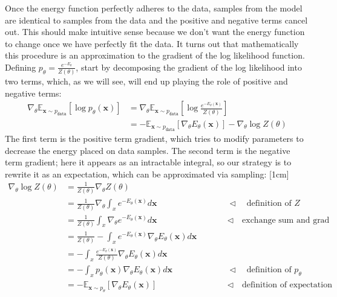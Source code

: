 Once the energy function perfectly adheres to the data, samples from the model are identical to samples from the data and the positive and negative terms cancel out. This should make intuitive sense because we don't want the energy function to change once we have perfectly fit the data. It turns out that mathematically this procedure is an approximation to the gradient of the log likelihood function. Defining $p_{\theta} = \frac{e^{-E_{\theta}}}{Z(\theta)}$, start by decomposing the gradient of the log likelihood into two terms, which, as we will see, will end up playing the role of positive and negative terms:
\begin{align}
    \nabla_{\theta} \mathbb{E}_{\mathbf{x} \sim p_{\texttt{data}}}[\log p_{\theta}(\mathbf{x})] &= \nabla_{\theta} \mathbb{E}_{\mathbf{x} \sim p_{\texttt{data}}}[\log \frac{e^{-E_{\theta}(\mathbf{x})}}{Z(\theta)}]\\
    &= -\mathbb{E}_{\mathbf{x} \sim p_{\texttt{data}}}[\nabla_{\theta} E_{\theta}(\mathbf{x})] - \nabla_{\theta} \log Z(\theta)\label{eqn:generative_models:cd}
\end{align}
The first term is the positive term gradient, which tries to modify parameters to decrease the energy placed on data samples. The second term is the negative term gradient; here it appears as an intractable integral, so our strategy is to rewrite it as an expectation, which can be approximated via sampling:
[1cm]
\begin{align}
    \nabla_{\theta} \log Z(\theta) &= \frac{1}{Z(\theta)}\nabla_{\theta}Z(\theta) \label{eqn:generative_models:grad_log_identity} \\
    &= \frac{1}{Z(\theta)} \nabla_{\theta} \int_x e^{-E_{\theta}(\mathbf{x})}d\mathbf{x} &&\quad\quad \triangleleft \quad \text{definition of $Z$}\\
    &= \frac{1}{Z(\theta)} \int_x \nabla_{\theta} e^{-E_{\theta}(\mathbf{x})}d\mathbf{x} &&\quad\quad \triangleleft \quad \text{exchange sum and grad}\\
    &= \frac{1}{Z(\theta)} -\int_x e^{-E_{\theta}(\mathbf{x})} \nabla_{\theta} E_{\theta}(\mathbf{x})d\mathbf{x}\\
    &= -\int_x \frac{e^{-E_{\theta}(\mathbf{x})}}{Z(\theta)} \nabla_{\theta} E_{\theta}(\mathbf{x})d\mathbf{x}\\
    &= -\int_x p_{\theta}(\mathbf{x}) \nabla_{\theta} E_{\theta}(\mathbf{x})d\mathbf{x} &&\quad\quad \triangleleft \quad \text{definition of $p_{\theta}$}\\
    &= -\mathbb{E}_{\mathbf{x} \sim p_{\theta}}[\nabla_{\theta} E_{\theta}(\mathbf{x})] &&\quad\quad \triangleleft \quad \text{definition of expectation}\label{eqn:generative_models:cd_neg}
\end{align}
